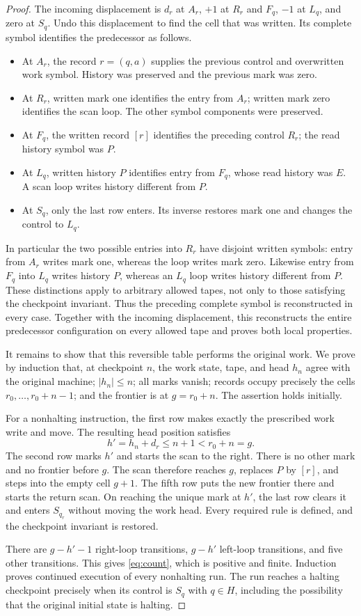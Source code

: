 \documentclass[11pt]{article}
\theoremstyle{remark}
\begin{document}
\begin{proof}
The incoming displacement is $d_r$ at $A_r$, $+1$ at $R_r$ and $F_q$,
$-1$ at $L_q$, and zero at $S_q$. Undo this displacement to find the cell
that was written. Its complete symbol identifies the predecessor as follows.
\begin{itemize}[leftmargin=*,itemsep=2pt]
\item At $A_r$, the record $r=(q,a)$ supplies the previous control and
overwritten work symbol. History was preserved and the previous mark was zero.
\item At $R_r$, written mark one identifies the entry from $A_r$; written
mark zero identifies the scan loop. The other symbol components were preserved.
\item At $F_q$, the written record $[r]$ identifies the preceding control
$R_r$; the read history symbol was $P$.
\item At $L_q$, written history $P$ identifies entry from $F_q$, whose
read history was $E$. A scan loop writes history different from $P$.
\item At $S_q$, only the last row enters. Its inverse restores mark one and
changes the control to $L_q$.
\end{itemize}
In particular the two possible entries into $R_r$ have disjoint written
symbols: entry from $A_r$ writes mark one, whereas the loop writes mark zero.
Likewise entry from $F_q$ into $L_q$ writes history $P$, whereas an $L_q$
loop writes history different from $P$. These distinctions apply to arbitrary
allowed tapes, not only to those satisfying the checkpoint invariant.
Thus the preceding complete symbol is reconstructed in every case. Together
with the incoming displacement, this reconstructs the entire predecessor
configuration on every allowed tape and proves both local properties.

It remains to show that this reversible table performs the original work.
We prove by induction that, at checkpoint $n$, the work state, tape, and head
$h_n$ agree with the original machine; $|h_n|\le n$; all marks vanish;
records occupy precisely the cells $r_0,\ldots,r_0+n-1$; and the frontier
is at $g=r_0+n$. The assertion holds initially.

For a nonhalting instruction, the first row makes exactly the prescribed
work write and move. The resulting head position satisfies
\[
 h'=h_n+d_r\le n+1<r_0+n=g.
\]
The second row marks $h'$ and starts the scan to the right. There is no
other mark and no frontier before $g$. The scan therefore reaches $g$,
replaces $P$ by $[r]$, and steps into the empty cell $g+1$. The fifth row
puts the new frontier there and starts the return scan. On reaching the
unique mark at $h'$, the last row clears it and enters $S_{q_r}$ without
moving the work head. Every required rule is defined, and the checkpoint
invariant is restored.

There are $g-h'-1$ right-loop transitions, $g-h'$ left-loop transitions,
and five other transitions. This gives \eqref{eq:count}, which is positive
and finite. Induction proves continued execution of every nonhalting run.
The run reaches a halting checkpoint precisely when its control is $S_q$
with $q\in H$, including the possibility that the original initial state is halting.
\end{proof}
\end{document}
